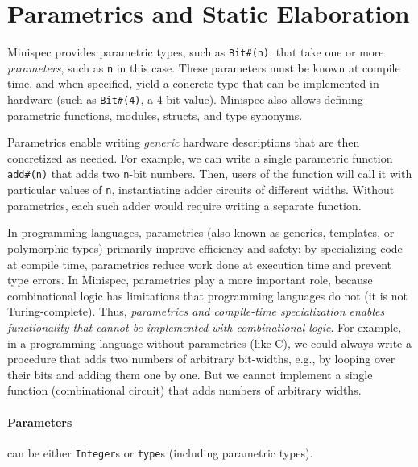 \section{Parametrics and Static Elaboration}
\label{sec:parametrics}

Minispec provides parametric types, such as \texttt{Bit\#(n)},
that take one or more \emph{parameters}, such as \texttt{n} in this case.
These parameters must be known at compile time, and when specified,
yield a concrete type that can be implemented in hardware (such as \texttt{Bit\#(4)}, a 4-bit value).
Minispec also allows defining parametric functions, modules, structs, and type synonyms.

Parametrics enable writing \emph{generic} hardware descriptions
that are then concretized as needed. For example,
we can write a single parametric function \texttt{add\#(n)}
that adds two \texttt{n}-bit numbers.
Then, users of the function will call it with particular values of \texttt{n},
instantiating adder circuits of different widths.
Without parametrics, each such adder would require writing a separate function.

In programming languages, parametrics (also known as generics, templates, or polymorphic types)
primarily improve efficiency and safety: by specializing code at compile time,
parametrics reduce work done at execution time and prevent type errors.
In Minispec, parametrics play a more important role,
because combinational logic has limitations that programming languages do not (it is not Turing-complete).
Thus, \emph{parametrics and compile-time specialization enables functionality that cannot be implemented with combinational logic}.
For example, in a programming language without parametrics (like C),
we could always write a procedure that adds two numbers of arbitrary bit-widths,
e.g., by looping over their bits and adding them one by one.
But we cannot implement a single function (combinational circuit)
that adds numbers of arbitrary widths.


\paragraph{Parameters} can be either \texttt{Integer}s or \texttt{type}s (including parametric types).

